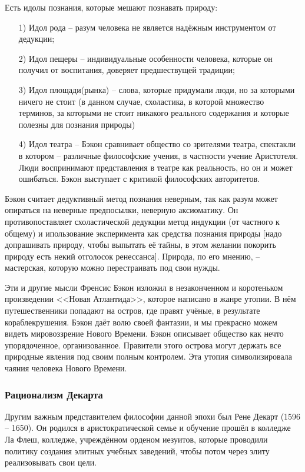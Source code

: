 \documentclass[a4paper, 12pt]{book} %
\begin{document}
Есть идолы познания, которые мешают познавать природу:
\begin{itemize}
\item[1)] Идол рода -- разум человека не является надёжным инструментом от дедукции;
\item[2)] Идол пещеры -- индивидуальные особенности человека, которые он получил от воспитания, доверяет предшествущей традиции;
\item[3)] Идол площади(рынка) -- слова, которые придумали люди, но за которыми ничего не стоит (в данном случае, схоластика, в которой множество терминов, за которыми не стоит никакого реального содержания и которые полезны для познания природы)
\item[4)] Идол театра -- Бэкон сравнивает общество со зрителями театра, спектакли в котором -- различные философские учения, в частности учение Аристотеля. Люди воспринимают представления в театре как реальность, но он и может ошибаться. Бэкон выступает с критикой философских авторитетов.	
\end{itemize}

Бэкон считает дедуктивный метод познания неверным, так как разум может опираться на неверные предпосылки, неверную аксиоматику. Он противопоставляет схоластической дедукции метод индукции (от частного к общему) и ипользование эксперимента как средства познания природы [надо допрашивать природу, чтобы выпытать её тайны, в этом желании покорить природу есть некий отголосок ренессанса]. Природа, по его мнению, -- мастерская, которую можно перестраивать под свои нужды.

Эти и другие мысли Френсис Бэкон изложил в незаконченном и коротеньком произведении <<Новая Атлантида>>, которое написано в жанре утопии. В нём путешественники попадают на остров, где правят учёные, в результате кораблекрушения. Бэкон даёт волю своей фантазии, и мы прекрасно можем видеть мировоззрение Нового Времени. Бэкон описывает общество как нечто упорядоченное, организованное. Правители этого острова могут держать все природные явления под своим полным контролем. Эта утопия символизировала чаяния человека Нового Времени.

\subsubsection{Рационализм Декарта}
Другим важным представителем философии данной эпохи был Рене Декарт (1596 -- 1650). Он родился в аристократической семье и обучение прошёл в колледже Ла Флеш, колледже, учреждённом орденом иезуитов, которые проводили политику создания элитных учебных заведений, чтобы потом через элиту реализовывать свои цели. 
\end{document}
